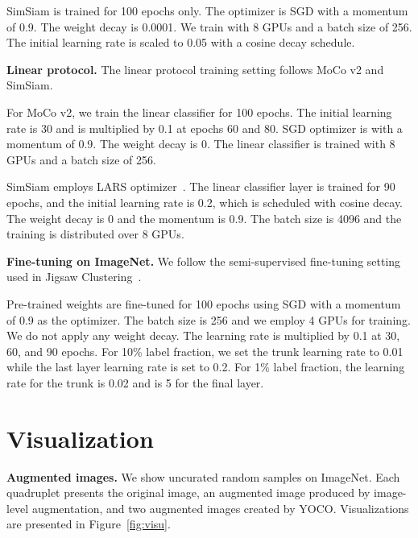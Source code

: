 \documentclass{article}
\begin{document}
SimSiam is trained for 100 epochs only. The optimizer is SGD with a momentum of 0.9. The weight decay is 0.0001. We train with 8 GPUs and a batch size of 256. The initial learning rate is scaled to 0.05 with a cosine decay schedule. 

\textbf{Linear protocol.}
The linear protocol training setting follows MoCo v2 and SimSiam.

For MoCo v2, we train the linear classifier for 100 epochs. The initial learning rate is 30 and is multiplied by 0.1 at epochs 60 and 80. SGD optimizer is with a momentum of 0.9. The weight decay is 0. The linear classifier is trained with 8 GPUs and a batch size of 256.

SimSiam employs LARS optimizer~\cite{you2017large}. The linear classifier layer is trained for 90 epochs, and the initial learning rate is 0.2, which is scheduled with cosine decay. The weight decay is 0 and the momentum is 0.9. The batch size is 4096 and the training is distributed over 8 GPUs.

\textbf{Fine-tuning on ImageNet.} 
We follow the semi-supervised fine-tuning setting used in Jigsaw Clustering~\cite{chen2021jigsaw}. 

Pre-trained weights are fine-tuned for 100 epochs using SGD with a momentum of 0.9 as the optimizer. The batch size is 256 and we employ 4 GPUs for training. We do not apply any weight decay. The learning rate is multiplied by 0.1 at 30, 60, and 90 epochs.
For 10\% label fraction, we set the trunk learning rate to 0.01 while the last layer learning rate is set to 0.2. For 1\% label fraction, the learning rate for the trunk is 0.02 and is 5 for the final layer. 

\section{Visualization}
\label{sec:appendix_visualization}

\textbf{Augmented images.} We show uncurated random samples on ImageNet. Each quadruplet presents the original image, an augmented image produced by image-level augmentation, and two augmented images created by YOCO. Visualizations are presented in Figure~\ref{fig:visu}.
\end{document}
